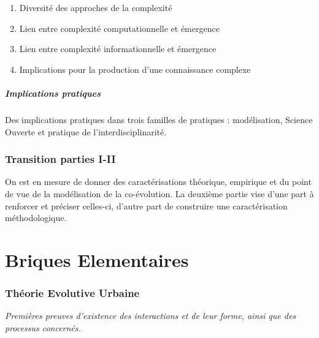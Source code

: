 \begin{enumerate}
	\item Diversité des approches de la complexité
	\item Lien entre complexité computationnelle et émergence
	\item Lien entre complexité informationnelle et émergence
	\item Implications pour la production d'une connaissance complexe
\end{enumerate}





\subsubsection*{Implications pratiques}

Des implications pratiques dans trois familles de pratiques : modélisation, Science Ouverte et pratique de l'interdisciplinarité.




\section*{Transition parties I-II}


On est en mesure de donner des caractérisations théorique, empirique et du point de vue de la modélisation de la co-évolution. La deuxième partie vise d'une part à renforcer et préciser celles-ci, d'autre part de construire une caractérisation méthodologique.









\part{Briques Elementaires}



\section{Théorie Evolutive Urbaine}

\textit{Premières preuves d'existence des interactions et de leur forme, ainsi que des processus concernés.}

